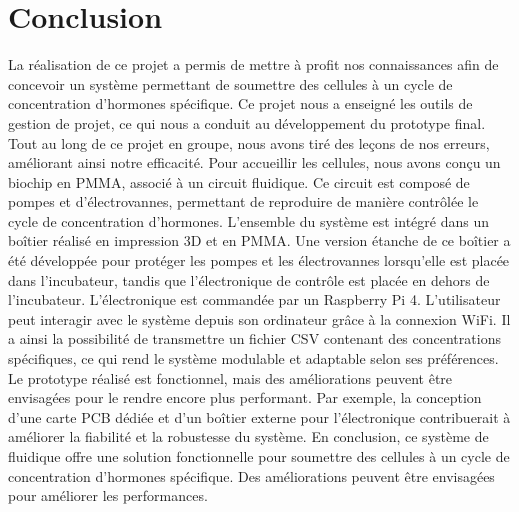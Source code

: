 \documentclass[a4paper, 11pt]{article}
\begin{document}
\section{Conclusion}
La réalisation de ce projet a permis de mettre à profit nos connaissances afin de concevoir un système permettant de soumettre des cellules à un cycle de concentration d'hormones spécifique. Ce projet nous a enseigné les outils de gestion de projet, ce qui nous a conduit au développement du prototype final. Tout au long de ce projet en groupe, nous avons tiré des leçons de nos erreurs, améliorant ainsi notre efficacité.
\newline
Pour accueillir les cellules, nous avons conçu un biochip en PMMA, associé à un circuit fluidique. Ce circuit est composé de pompes et d'électrovannes, permettant de reproduire de manière contrôlée le cycle de concentration d'hormones.
\newline
L'ensemble du système est intégré dans un boîtier réalisé en impression 3D et en PMMA. Une version étanche de ce boîtier a été développée pour protéger les pompes et les électrovannes lorsqu'elle est placée dans l'incubateur, tandis que l'électronique de contrôle est placée en dehors de l'incubateur.
\newline
L'électronique est commandée par un Raspberry Pi 4. L'utilisateur peut interagir avec le système depuis son ordinateur grâce à la connexion WiFi. Il a ainsi la possibilité de transmettre un fichier CSV contenant des concentrations spécifiques, ce qui rend le système modulable et adaptable selon ses préférences.
\newline
Le prototype réalisé est fonctionnel, mais des améliorations peuvent être envisagées pour le rendre encore plus performant. Par exemple, la conception d'une carte PCB dédiée et d'un boîtier externe pour l'électronique contribuerait à améliorer la fiabilité et la robustesse du système.
\newline
En conclusion, ce système de fluidique offre une solution fonctionnelle pour soumettre des cellules à un cycle de concentration d'hormones spécifique. Des améliorations peuvent être envisagées pour améliorer les performances.

\newpage


%
\printbibliography
\end{document}
